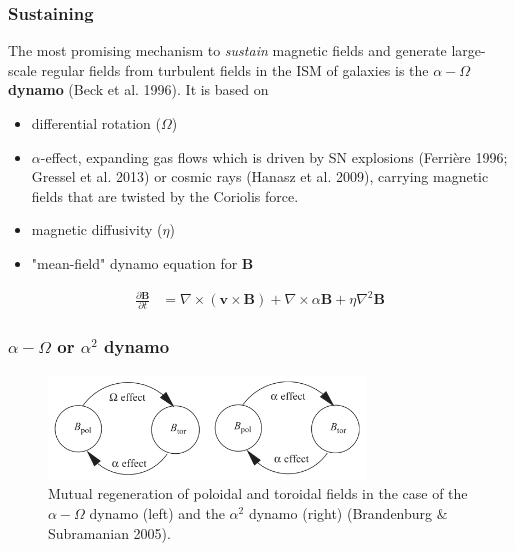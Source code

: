 \documentclass[10pt,aspectratio=169]{beamer}
\begin{document}
\begin{frame}
	\frametitle{Sustaining}
	The most promising mechanism to \textit{sustain} magnetic fields and generate large-scale regular fields from turbulent fields in the ISM of galaxies is the \textbf{$\alpha-\Omega$} \textbf{dynamo} (Beck et al. 1996). It is based on 
	\begin{itemize}
		\item differential rotation ($\Omega$)
		\item $\alpha$-effect, expanding gas flows which is driven by SN explosions (Ferrière 1996; Gressel et al. 2013) or cosmic rays (Hanasz et al. 2009), carrying magnetic fields that are twisted by the Coriolis force.
		\item magnetic diffusivity ($\eta$)
		\item "mean-field" dynamo equation for \textbf{B}
	\end{itemize}
	\begin{align}
	\frac{\partial \mathbf{B}}{\partial t} &= \nabla \times \left( \mathbf{v} \times \mathbf{B} \right) + \nabla \times \alpha \mathbf{B} 
	+ \eta \nabla^2 \mathbf{B}
	\end{align}
\end{frame}
\begin{frame}
	\frametitle{$\alpha-\Omega$ or $\alpha^2$ dynamo} 
		\begin{figure}
			\includegraphics[width=0.75\textwidth]{./images/alpha_omega.png}
			\caption{Mutual regeneration of poloidal and toroidal fields in the case of the $\alpha-\Omega$ dynamo (left) and the $\alpha^2$ dynamo (right) (Brandenburg $\&$ Subramanian 2005).}
		\end{figure}
	\end{frame}
\end{document}
